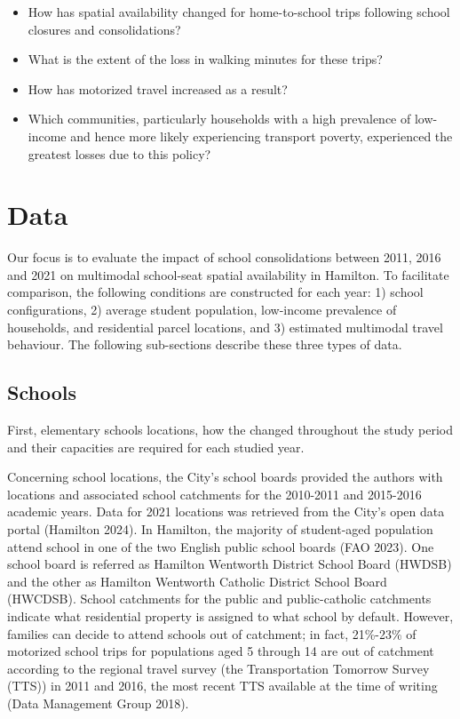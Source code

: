 \documentclass[
default
]{sn-jnl}
\providecommand{\tightlist}{%
  \setlength{\itemsep}{0pt}\setlength{\parskip}{0pt}}\usepackage{longtable,booktabs,array}
\begin{document}
\begin{itemize}
\tightlist
\item
  How has spatial availability changed for home-to-school trips
  following school closures and consolidations?
\item
  What is the extent of the loss in walking minutes for these trips?
\item
  How has motorized travel increased as a result?
\item
  Which communities, particularly households with a high prevalence of
  low-income and hence more likely experiencing transport poverty,
  experienced the greatest losses due to this policy?
\end{itemize}

\section{Data}\label{data}

Our focus is to evaluate the impact of school consolidations between
2011, 2016 and 2021 on multimodal school-seat spatial availability in
Hamilton. To facilitate comparison, the following conditions are
constructed for each year: 1) school configurations, 2) average student
population, low-income prevalence of households, and residential parcel
locations, and 3) estimated multimodal travel behaviour. The following
sub-sections describe these three types of data.

\subsection{Schools}\label{schools}

First, elementary schools locations, how the changed throughout the
study period and their capacities are required for each studied year.

Concerning school locations, the City's school boards provided the
authors with locations and associated school catchments for the
2010-2011 and 2015-2016 academic years. Data for 2021 locations was
retrieved from the City's open data portal (Hamilton 2024). In Hamilton,
the majority of student-aged population attend school in one of the two
English public school boards (FAO 2023). One school board is referred as
Hamilton Wentworth District School Board (HWDSB) and the other as
Hamilton Wentworth Catholic District School Board (HWCDSB). School
catchments for the public and public-catholic catchments indicate what
residential property is assigned to what school by default. However,
families can decide to attend schools out of catchment; in fact,
21\%-23\% of motorized school trips for populations aged 5 through 14
are out of catchment according to the regional travel survey (the
Transportation Tomorrow Survey (TTS)) in 2011 and 2016, the most recent
TTS available at the time of writing (Data Management Group 2018).
\end{document}
